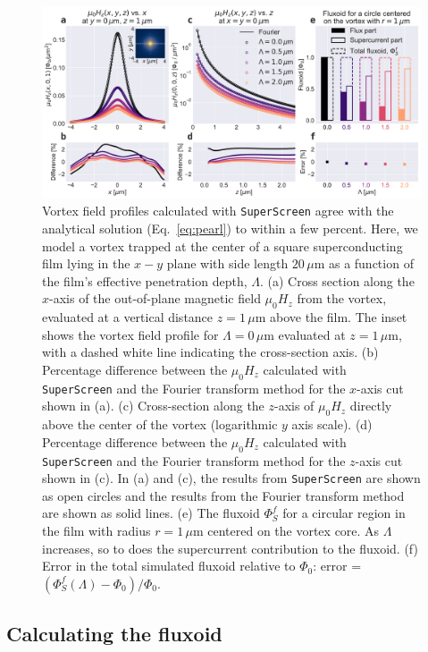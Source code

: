 \documentclass[final,3p,times,twocolumn]{elsarticle}
\newcommand{\inline}[1]{\texttt{#1}\xspace}
\newcommand{\SuperScreen}{\inline{SuperScreen}}
\newcommand{\um}{\mu\mathrm{m}}
\begin{document}
\begin{figure}[h!]
    \centering
    \includegraphics[width=\textwidth]{examples/images/pearl.pdf}
    \caption{Vortex field profiles calculated with \SuperScreen agree with the analytical solution (Eq.~\ref{eq:pearl}) to within a few percent. Here, we model a vortex trapped at the center of a square superconducting film lying in the $x-y$ plane with side length $20\,\um$ as a function of the film's effective penetration depth, $\Lambda$. (a) Cross section along the $x$-axis of the out-of-plane magnetic field $\mu_0H_z$ from the vortex, evaluated at a vertical distance $z=1\,\um$ above the film. The inset shows the vortex field profile for $\Lambda=0\,\um$ evaluated at $z=1\,\um$, with a dashed white line indicating the cross-section axis. (b) Percentage difference between the $\mu_0H_z$ calculated with \SuperScreen and the Fourier transform method for the $x$-axis cut shown in (a). (c) Cross-section along the $z$-axis of $\mu_0H_z$ directly above the center of the vortex (logarithmic $y$ axis scale). (d) Percentage difference between the $\mu_0H_z$ calculated with \SuperScreen and the Fourier transform method for the $z$-axis cut shown in (c). In (a) and (c), the results from \SuperScreen are shown as open circles and the results from the Fourier transform method are shown as solid lines. (e) The fluxoid $\Phi_S^f$ for a circular region in the film with radius $r=1\,\um$ centered on the vortex core. As $\Lambda$ increases, so to does the supercurrent contribution to the fluxoid. (f) Error in the total simulated fluxoid relative to $\Phi_0$: error = $(\Phi_S^f(\Lambda) - \Phi_0) / \Phi_0$.}
    \label{fig:pearl}
\end{figure}

\subsection{Calculating the fluxoid}
\label{section:examples:fluxoid}
\end{document}
